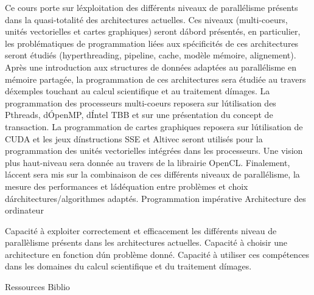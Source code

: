 {
Ce cours porte sur l\'exploitation des différents niveaux de parallélisme présents dans la quasi-totalité des architectures actuelles. Ces niveaux (multi-coeurs, unités vectorielles et cartes graphiques) seront d\'abord présentés, en particulier, les problématiques de programmation liées aux spécificités de ces architectures seront étudiés (hyperthreading, pipeline, cache, modèle mémoire, alignement).
Après une introduction aux structures de données adaptées au parallélisme en mémoire partagée, la programmation de ces architectures sera étudiée au travers d\'exemples touchant au calcul scientifique et au traitement d\'images. La programmation des processeurs multi-coeurs reposera sur l\'utilisation des Pthreads, d\'OpenMP, d\'Intel TBB et sur une présentation du concept de transaction. La programmation de cartes graphiques reposera sur l\'utilisation de CUDA et les jeux d\'instructions SSE et Altivec seront utilisés pour la programmation des unités vectorielles intégrées dans les processeurs. Une vision plus
haut-niveau sera donnée au travers de la librairie OpenCL. Finalement, l\'accent sera mis sur la combinaison de ces différents niveaux de parallélisme, la mesure des performances et l\'adéquation
entre problèmes et choix d\'architectures/algorithmes adaptés. 
} 
{Programmation impérative
Architecture des ordinateur} 
{\begin{itemize}
\ObjItem Capacité à exploiter correctement et efficacement les différents niveau de parallèlisme présents dans les architectures actuelles.
\ObjItem Capacité à choisir une architecture en fonction d\'un problème donné.
\ObjItem Capacité à utiliser ces compétences dans les domaines du calcul scientifique et du traitement d\'images.
\end{itemize} 
} 
{Ressources} 
{Biblio} 
 
